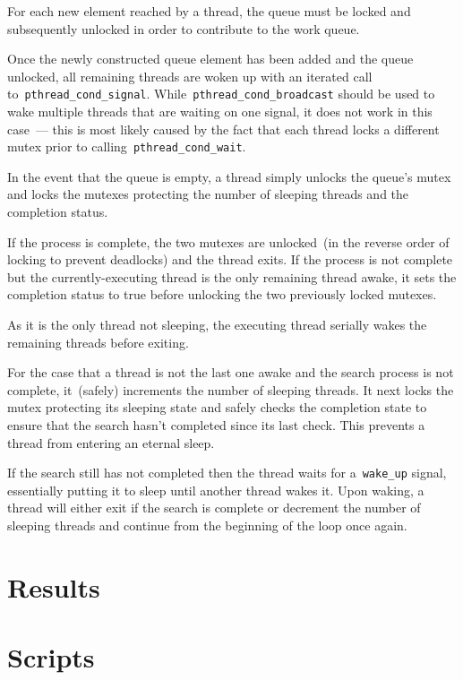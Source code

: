 \documentclass{article}
\newcommand{\clst}[2]{
	\begin{center}
	\parbox{.6\textwidth}{
	}
	\end{center}
}
\newcommand{\ttt}[1]{\texttt{#1}}
\begin{document}
For each new element reached by a thread, the queue must be locked and
subsequently unlocked in order to contribute to the work queue.
%
\clst{370}{383}
%
Once the newly constructed queue element has been added and the queue unlocked,
all remaining threads are woken up with an iterated call
to~\ttt{pthread\_cond\_signal}.  While~\ttt{pthread\_cond\_broadcast} should be
used to wake multiple threads that are waiting on one signal, it does not work
in this case~--- this is most likely caused by the fact that each thread locks
a different mutex prior to calling~\ttt{pthread\_cond\_wait}.

In the event that the queue is empty, a thread simply unlocks the queue's mutex
and locks the mutexes protecting the number of sleeping threads and the
completion status.
%
\clst{434}{445}
%
If the process is complete, the two mutexes are unlocked~(in the reverse order
of locking to prevent deadlocks) and the thread exits.  If the process is not
complete but the currently-executing thread is the only remaining thread awake,
it sets the completion status to true before unlocking the two previously
locked mutexes.
%
\clst{446}{457}
%
As it is the only thread not sleeping, the executing thread serially wakes the
remaining threads before exiting.

For the case that a thread is not the last one awake and the search process is
not complete, it~(safely) increments the number of sleeping threads.  It next
locks the mutex protecting its sleeping state and safely checks the completion
state to ensure that the search hasn't completed since its last check.  This
prevents a thread from entering an eternal sleep.
%
\clst{458}{486}
%
If the search still has not completed then the thread waits for
a~\ttt{wake\_up} signal, essentially putting it to sleep until another thread
wakes it.  Upon waking, a thread will either exit if the search is complete or
decrement the number of sleeping threads and continue from the beginning of the
loop once again.

\section{Results}
\begin{figure}[H]
\centering
	
\end{figure}
\appendix

\section{Scripts}
\end{document}
